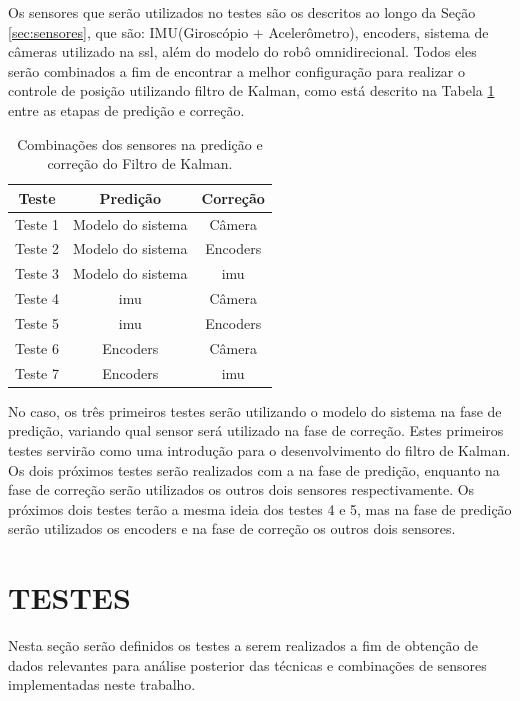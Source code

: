 \documentclass[acronym, symbols]{fei}
\begin{document}
		Os sensores que serão utilizados no testes são os descritos ao longo da Seção \ref{sec:sensores}, que são: IMU(Giroscópio + Acelerômetro), encoders, sistema de câmeras utilizado na \acrshort{ssl}, além do modelo do robô omnidirecional. Todos eles serão combinados a fim de encontrar a melhor configuração para realizar o controle de posição utilizando filtro de Kalman, como está descrito na Tabela \ref{tbl:combinacao_sensores} entre as etapas de predição e correção.
		
		\begin{table}[!htb]
			\centering
			\caption{Combinações dos sensores na predição e correção do Filtro de Kalman.}
			\label{tbl:combinacao_sensores}
			\begin{tabular}{|c|c|c|}
				\hline
				\textbf{Teste}   & \textbf{Predição}   & \textbf{Correção} \\ \hline
				Teste 1 & Modelo do sistema & Câmera   \\ \hline
				Teste 2 & Modelo do sistema & Encoders \\ \hline
				Teste 3 & Modelo do sistema & \acrshort{imu} \\ \hline
				Teste 4 & \acrshort{imu}    & Câmera   \\ \hline
				Teste 5 & \acrshort{imu}    & Encoders \\ \hline
				Teste 6 & Encoders          & Câmera   \\ \hline
				Teste 7 & Encoders          & \acrshort{imu} \\ \hline
			\end{tabular}
		\end{table}
		
		No caso, os três primeiros testes serão utilizando o modelo do sistema na fase de predição, variando qual sensor será utilizado na fase de correção. Estes primeiros testes servirão como uma introdução para o desenvolvimento do filtro de Kalman. Os dois próximos testes serão realizados com a  na fase de predição, enquanto na fase de correção serão utilizados os outros dois sensores respectivamente. Os próximos dois testes terão a mesma ideia dos testes 4 e 5, mas na fase de predição serão utilizados os encoders e na fase de correção os outros dois sensores.
	
	\section{TESTES}
	
		Nesta seção serão definidos os testes a serem realizados a fim de obtenção de dados relevantes para análise posterior das técnicas e combinações de sensores implementadas neste trabalho.
		
\end{document}

